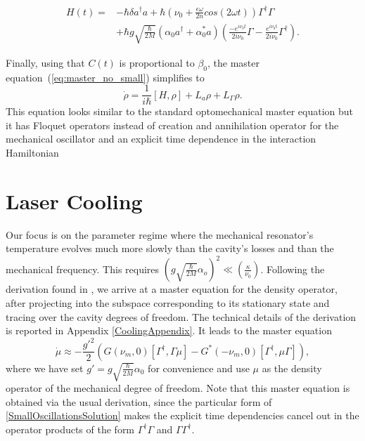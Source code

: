 \documentclass[reprint, amsmath,amssymb, aps,pra]{revtex4-1}
\begin{document}
\begin{align} \label{LCHamiltonian}
H(t) =& -\hbar \delta a^{\dagger}a +\hbar(\nu_0 + \frac{\epsilon \omega}{2n} cos(2\omega t))\Gamma^{\dagger}\Gamma \\
&+\hbar g\sqrt{\frac{\hbar}{2M}}(\alpha_0 a^{\dagger}+\alpha^*_0 a)(\frac{-e^{i\nu_0 t}}{2i\nu_0}\Gamma-\frac{
e^{i\nu_0 t}}{2i\nu_0} \nonumber\Gamma^{\dagger}).
\end{align}

Finally, using that $C(t)$ is proportional to $\beta_0$, the master
equation~(\ref{eq:master_no_small}) simplifies to
\begin{equation}\label{LCMasterEq}
\dot{\rho} = \frac{1}{i\hbar}[H,\rho] +L_a\rho + L_\Gamma \rho.
\end{equation}
This equation looks similar to the standard optomechanical master
equation but it has Floquet operators instead of creation and
annihilation operator for the mechanical oscillator and an explicit
time dependence in the interaction Hamiltonian


\section{Laser Cooling}\label{LasCool}

Our focus is on the parameter regime where the mechanical resonator's
temperature evolves much more slowly than the cavity's losses and than
the mechanical frequency. This requires
$(g\sqrt{\frac{\hbar}{2M}}\alpha_o)^2 \ll (\frac{\kappa}{\nu_0})$.
Following the derivation found in \cite{LCNooshi}, we arrive at a
master equation for the density operator, after projecting into the
subspace corresponding to its stationary state and tracing over the
cavity degrees of freedom. The technical details of the derivation is reported in Appendix \ref{CoolingAppendix}. It leads to the master
equation
\begin{equation}\label{eq:projected_master_equation}
  \dot{\mu}\approx -\frac{g'^2}{2}(G(\nu_m,0)[\Gamma^\dagger,\Gamma\mu]-G^*(-\nu_m,0)[\Gamma^\dagger,\mu\Gamma]),
\end{equation}
where we have set $g'=g\sqrt{\frac{\hbar}{2M}}\alpha_0$ for
convenience and use $\mu$ as the density operator of the mechanical
degree of freedom. Note that this master equation is obtained via the
usual derivation, since the particular form of
\eqref{SmallOscillationsSolution} makes the explicit time dependencies
cancel out in the operator products of the form
$\Gamma^\dagger \Gamma$ and $\Gamma \Gamma^\dagger$.
\end{document}

